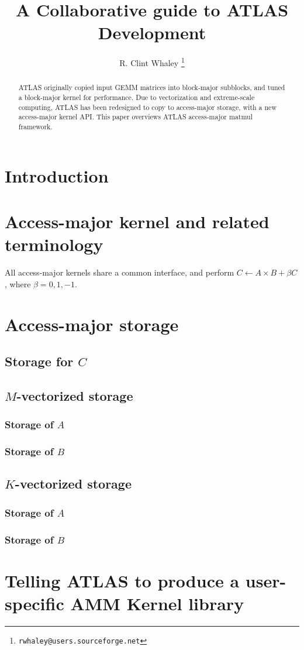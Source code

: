 \documentclass[11pt]{article}
\begin{document}
\begin{titlepage}
\title{A Collaborative guide to ATLAS Development}
\vspace{.4in}
\author
{
 R. Clint Whaley \thanks { {\tt rwhaley@users.sourceforge.net} }
}
\end{titlepage}
\maketitle
\begin{abstract}
ATLAS originally copied input GEMM matrices into block-major subblocks,
and tuned a block-major kernel for performance.  Due to vectorization
and extreme-scale computing, ATLAS has been redesigned to copy to 
access-major storage, with a new access-major kernel API. 
This paper overviews ATLAS access-major matmul framework.
\end{abstract}

\newpage
\tableofcontents

\newpage
\section{Introduction}
\section{Access-major kernel and related terminology}
All access-major kernels share a common interface, and perform
$C \leftarrow A \times B + \beta C$, where $\beta = 0, 1, -1$.
\section{Access-major storage}
\subsection{Storage for $C$}
\subsection{$M$-vectorized storage}
\subsubsection{Storage of $A$}
\subsubsection{Storage of $B$}
\subsection{$K$-vectorized storage}
\subsubsection{Storage of $A$}
\subsubsection{Storage of $B$}
\section{Telling ATLAS to produce a user-specific AMM Kernel library}
\end{document}
